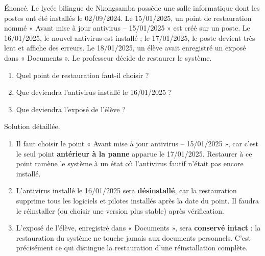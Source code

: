 \documentclass[11pt]{article}
\begin{document}
\begin{exoresolu}
Énoncé. Le lycée bilingue de Nkongsamba possède une salle informatique dont les postes ont été installés le 02/09/2024. Le 15/01/2025, un point de restauration nommé « Avant mise à jour antivirus -- 15/01/2025 » est créé sur un poste. Le 16/01/2025, le nouvel antivirus est installé ; le 17/01/2025, le poste devient très lent et affiche des erreurs. Le 18/01/2025, un élève avait enregistré un exposé dans « Documents ». Le professeur décide de restaurer le système.
\begin{enumerate}
\item Quel point de restauration faut-il choisir ?
\item Que deviendra l'antivirus installé le 16/01/2025 ?
\item Que deviendra l'exposé de l'élève ?
\end{enumerate}
\tcblower
Solution détaillée.
\begin{enumerate}
\item Il faut choisir le point « Avant mise à jour antivirus -- 15/01/2025 », car c'est le seul point \textbf{antérieur à la panne} apparue le 17/01/2025. Restaurer à ce point ramène le système à un état où l'antivirus fautif n'était pas encore installé.
\item L'antivirus installé le 16/01/2025 sera \textbf{désinstallé}, car la restauration supprime tous les logiciels et pilotes installés après la date du point. Il faudra le réinstaller (ou choisir une version plus stable) après vérification.
\item L'exposé de l'élève, enregistré dans « Documents », sera \textbf{conservé intact} : la restauration du système ne touche jamais aux documents personnels. C'est précisément ce qui distingue la restauration d'une réinstallation complète.
\end{enumerate}
\end{exoresolu}
\end{document}
